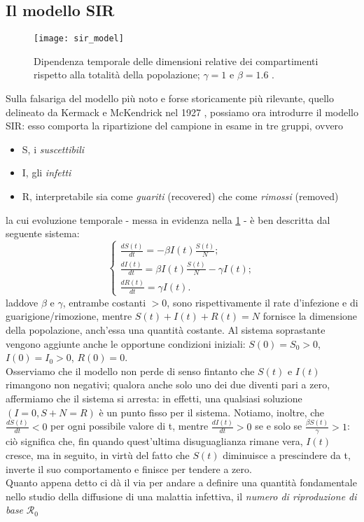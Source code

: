 \subsection{Il modello SIR}

\begin{figure}
		\begin{center}
			\texttt{[image: sir\_model]}
			\caption{Dipendenza temporale delle dimensioni relative dei compartimenti rispetto alla totalità della popolazione; $ \gamma = 1 $ e $ \beta = 1.6 $ \cite{Kiss}.}
			\label{fig:evolution}
		\end{center}
	\end{figure}
	
Sulla falsariga del modello più noto e forse storicamente più rilevante, quello delineato da Kermack e McKendrick nel 1927 \cite{Kermack}, possiamo ora introdurre il modello SIR: esso comporta la ripartizione del campione in esame in tre gruppi, ovvero
\begin{itemize}
\item S, i \emph{suscettibili}
\item I, gli \emph{infetti}
\item R, interpretabile sia come \emph{guariti} (recovered) che come \emph{rimossi} (removed)
\end{itemize}
la cui evoluzione temporale - messa in evidenza nella \cref{fig:evolution} - è ben descritta dal seguente sistema:
\begin{equation}
\begin{cases}
\frac{dS(t)}{dt} = - \beta I(t) \frac{S(t)}{N}; \\
\frac{dI(t)}{dt} = \beta I(t) \frac{S(t)}{N} - \gamma I(t); \\
\frac{dR(t)}{dt} = \gamma I(t).
\end{cases} 
\label{SIR}
\end{equation}
laddove $\beta$ e $\gamma$, entrambe costanti $> 0$, sono rispettivamente il rate d'infezione e di guarigione/rimozione, mentre $S(t) + I(t) + R(t) = N$ fornisce la dimensione della popolazione, anch'essa una quantità costante. Al sistema soprastante vengono aggiunte anche le opportune condizioni iniziali: $S(0) = S_0 > 0$, $I(0) = I_0 > 0$, $R(0) = 0$. 
\\Osserviamo che il modello non perde di senso fintanto che $S(t)$ e $I(t)$ rimangono non negativi;
qualora anche solo uno dei due diventi pari a zero, affermiamo che il sistema si arresta: in effetti, una qualsiasi soluzione $ \left( I = 0, S + N = R \right)$ è un punto fisso per il sistema. Notiamo, inoltre, che $\frac{dS(t)}{dt} < 0$ per ogni possibile valore di t, mentre $\frac{dI(t)}{dt} > 0$ se e solo se $\frac{\beta S(t)}{\gamma} > 1$: ciò significa che, fin quando quest'ultima disuguaglianza rimane vera, $I(t)$ cresce, ma in seguito, in virtù del fatto che $S(t)$ diminuisce a prescindere da t, inverte il suo comportamento e finisce per tendere a zero. \\ Quanto appena detto ci dà il via per andare a definire una quantità fondamentale nello studio della diffusione di una malattia infettiva, il \emph{numero di riproduzione di base} $\mathcal{R}_0$ 
